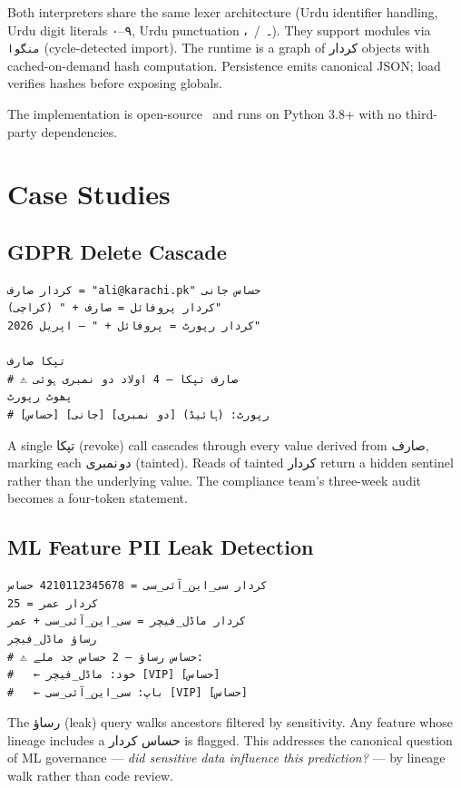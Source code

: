\documentclass[10pt,twocolumn]{article}
\newcommand{\ur}[1]{{\urdufont #1}}
\begin{document}
Both interpreters share the same lexer architecture (Urdu identifier handling, Urdu digit literals \ur{۰}--\ur{۹}, Urdu punctuation \ur{،}~/~\ur{۔}). They support modules via \texttt{\ur{منگوا}} (cycle-detected import). The runtime is a graph of \ur{کردار} objects with cached-on-demand hash computation. Persistence emits canonical JSON; load verifies hashes before exposing globals.

The implementation is open-source~\cite{bhai-repo} and runs on Python 3.8+ with no third-party dependencies.

\section{Case Studies}
\label{sec:cases}

\subsection{GDPR Delete Cascade}

\begin{lstlisting}[caption={GDPR cascade in 7 lines.},captionpos=b]
کردار صارف = "ali@karachi.pk" حساس جانی
کردار پروفائل = صارف + " (کراچی)"
کردار رپورٹ = پروفائل + " — اپریل 2026"

تپکا صارف
# ⚠ صارف تپکا — 4 اولاد دو نمبری ہوئی
پھوٹ رپورٹ
# رپورٹ: (ہائیڈ) [دو نمبری] [جانی] [حساس]
\end{lstlisting}

A single \ur{تپکا} (revoke) call cascades through every value derived from \ur{صارف}, marking each \ur{دو\,نمبری} (tainted). Reads of tainted \ur{کردار} return a hidden sentinel rather than the underlying value. The compliance team's three-week audit becomes a four-token statement.

\subsection{ML Feature PII Leak Detection}

\begin{lstlisting}[caption={Feature provenance audit.},captionpos=b]
کردار سی_این_آئی_سی = 4210112345678 حساس
کردار عمر = 25
کردار ماڈل_فیچر = سی_این_آئی_سی + عمر
رساؤ ماڈل_فیچر
# ⚠ حساس رساؤ — 2 حساس جد ملے:
#   ← خود: ماڈل_فیچر [VIP] [حساس]
#   ← باپ: سی_این_آئی_سی [VIP] [حساس]
\end{lstlisting}

The \ur{رساؤ} (leak) query walks ancestors filtered by sensitivity. Any feature whose lineage includes a \ur{حساس} \ur{کردار} is flagged. This addresses the canonical question of ML governance — \emph{did sensitive data influence this prediction?} — by lineage walk rather than code review.
\end{document}
